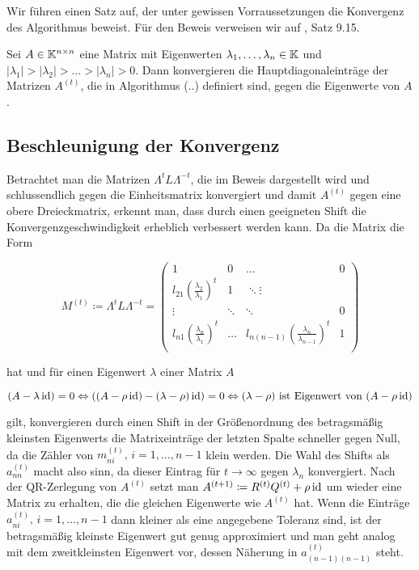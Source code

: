 \documentclass{article}
\begin{document}
Wir führen einen Satz auf, der unter gewissen Vorraussetzungen die Konvergenz des Algorithmus beweist. Für den Beweis verweisen wir auf \cite{Nannen-Skript}, Satz 9.15.

\begin{theorem}
	Sei $A \in \mathbb{K}^{n\times n}$ eine Matrix mit Eigenwerten $\lambda_1,\dots,\lambda_n \in \mathbb{K}$ und $|\lambda_1| > |\lambda_2| > \dots > |\lambda_n| > 0$. Dann konvergieren die Hauptdiagonaleinträge der Matrizen $A^{(t)}$, die in Algorithmus (..) definiert sind, gegen die Eigenwerte von $A$.
\end{theorem}


\subsection{Beschleunigung der Konvergenz}

Betrachtet man die Matrizen $\Lambda^t L \Lambda^{-t}$, die im Beweis dargestellt wird und schlussendlich gegen die Einheitsmatrix konvergiert und damit $A^{(t)}$ gegen eine obere Dreieckmatrix, erkennt man, dass durch einen geeigneten Shift die Konvergenzgeschwindigkeit erheblich verbessert werden kann. Da die Matrix die Form

\begin{equation*}
 	M^{(t)} \coloneqq \Lambda^t L \Lambda^{-t} = 
 	\left( \begin{array}{rrrr}
 		1 & 0 & \dots & 0 \\ 
 		l_{21} \left(\frac{\lambda_2}{\lambda_1}\right)^t & 1 & \ddots \vdots \\
 		\vdots & \ddots & \ddots & 0 \\
 		l_{n1} \left(\frac{\lambda_n}{\lambda_1}\right)^t & \dots & l_{n(n-1)} \left(\frac{\lambda_n}{\lambda_{n-1}}\right)^t & 1 \\ 
 	\end{array}\right)
\end{equation*}

hat und für einen Eigenwert $\lambda$ einer Matrix $A$

\begin{equation*}
	(A - \lambda \operatorname{id}) = 0 \Leftrightarrow ((A - \rho \operatorname{id}) - (\lambda -\rho) \operatorname{id}) = 0 \Leftrightarrow (\lambda-\rho) \text{ ist Eigenwert von }  (A - \rho \operatorname{id})
\end{equation*}

gilt, konvergieren durch einen Shift in der Größenordnung des betragsmäßig kleinsten Eigenwerts die Matrixeinträge der letzten Spalte schneller gegen Null, da die Zähler von $m^{(t)}_{ni}, \, i = 1,\dots, n-1$ klein werden. Die Wahl des Shifts als $a^{(t)}_{nn}$ macht also sinn, da dieser Eintrag für $t \rightarrow \infty$ gegen $\lambda_n$ konvergiert. Nach der QR-Zerlegung von $A^{(t)}$ setzt man $A^{(t+1)} \coloneqq R^{(t)}Q^{(t)} + \rho \operatorname{id}$ um wieder eine Matrix zu erhalten, die die gleichen Eigenwerte wie $A^{(t)}$ hat.
Wenn die Einträge $a^{(t)}_{ni}, \, i = 1,\dots, n-1$ dann kleiner als eine angegebene Toleranz sind, ist der betragsmäßig kleinste Eigenwert gut genug approximiert und man geht analog mit dem zweitkleinsten Eigenwert vor, dessen Näherung in $a^{(t)}_{(n-1)(n-1)}$ steht.\\
\end{document}
